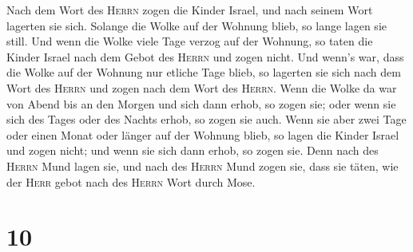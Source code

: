  Nach dem Wort des \textsc{Herrn} zogen die Kinder
Israel, und nach seinem Wort lagerten sie sich. Solange die Wolke auf
der Wohnung blieb, so lange lagen sie still.  Und wenn
die Wolke viele Tage verzog auf der Wohnung, so taten die Kinder Israel
nach dem Gebot des \textsc{Herrn} und zogen nicht.  Und
wenn's war, dass die Wolke auf der Wohnung nur etliche Tage blieb, so
lagerten sie sich nach dem Wort des \textsc{Herrn} und zogen nach dem
Wort des \textsc{Herrn}.  Wenn die Wolke da war von Abend
bis an den Morgen und sich dann erhob, so zogen sie; oder wenn sie sich
des Tages oder des Nachts erhob, so zogen sie auch.  Wenn
sie aber zwei Tage oder einen Monat oder länger auf der Wohnung blieb,
so lagen die Kinder Israel und zogen nicht; und wenn sie sich dann
erhob, so zogen sie.  Denn nach des \textsc{Herrn} Mund
lagen sie, und nach des \textsc{Herrn} Mund zogen sie, dass sie täten,
wie der \textsc{Herr} gebot nach des \textsc{Herrn} Wort durch Mose.

\hypertarget{section-9}{%
\section{10}\label{section-9}}

